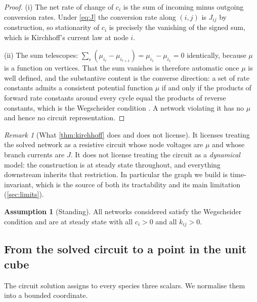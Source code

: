\documentclass[11pt,twocolumn,a4paper]{article}
\theoremstyle{plain}
\theoremstyle{definition}
\newtheorem{assumption}[theorem]{Assumption}
\theoremstyle{remark}
\newtheorem{remark}[theorem]{Remark}
\begin{document}
\begin{proof}
(i) The net rate of change of $c_i$ is the sum of incoming minus outgoing
conversion rates. Under \cref{eq:J} the conversion rate along $(i,j)$ is $J_{ij}$
by construction, so stationarity of $c_i$ is precisely the vanishing of the
signed sum, which is Kirchhoff's current law at node $i$.

(ii) The sum telescopes: $\sum_{r}(\mu_{i_r} - \mu_{i_{r+1}}) = \mu_{i_1} - \mu_{i_1} = 0$
identically, because $\mu$ is a function on vertices. That the sum vanishes is
therefore automatic once $\mu$ is well defined, and the substantive content is
the converse direction: a set of rate constants admits a consistent potential
function $\mu$ if and only if the products of forward rate constants around
every cycle equal the products of reverse constants, which is the Wegscheider
condition \citep{Wegscheider1901,Schuster1989}. A network violating it has no
$\mu$ and hence no circuit representation.
\end{proof}

\begin{remark}[What \cref{thm:kirchhoff} does and does not license]
It licenses treating the solved network as a resistive circuit whose node
voltages are $\mu$ and whose branch currents are $J$. It does not license
treating the circuit as a \emph{dynamical} model: the construction is at steady
state throughout, and everything downstream inherits that restriction. In
particular the graph we build is time-invariant, which is the source of both its
tractability and its main limitation (\cref{sec:limits}).
\end{remark}

\begin{assumption}[Standing]
\label{ass:standing}
All networks considered satisfy the Wegscheider condition and are at steady
state with all $c_i > 0$ and all $k_{ij} > 0$.
\end{assumption}

\subsection{From the solved circuit to a point in the unit cube}

The circuit solution assigns to every species three scalars. We normalise them
into a bounded coordinate.
\end{document}
